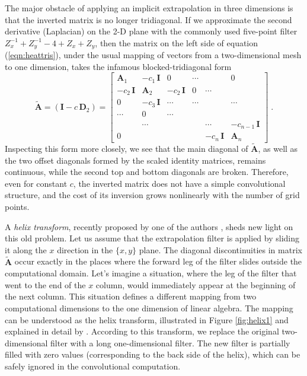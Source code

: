 The major obstacle of applying an implicit extrapolation in three
dimensions is that the inverted matrix is no longer tridiagonal. If we
approximate the second derivative (Laplacian) on the 2-D plane with
the commonly used five-point filter $Z_x^{-1} + Z_y^{-1} -4 + Z_x +
Z_y$, then the matrix on the left side of equation
(\ref{eqn:heattris}), under the usual mapping of vectors from a
two-dimensional mesh to one dimension, takes the infamous
blocked-tridiagonal form \cite[]{birk}
\begin{equation}\label{eqn:matrix2}
  \tilde{\mathbf{A}} = \left(\mathbf{I} -c\,\mathbf{D}_2\right) =
  \left[\begin{array}{cccccc}
  \mathbf{A}_1   & -c_1 \,\mathbf{I}    &  0     & \cdots &        & 0      \\
  -c_2 \,\mathbf{I}    & \mathbf{A}_2   & -c_2 \,\mathbf{I}    & 0      & \cdots &        \\
  0      & -c_3 \,\mathbf{I}     & \cdots & \cdots &        & \cdots \\
  \cdots & 0      & \cdots &        &        &        \\
         & \cdots &        &        & \cdots & -c_{n-1} \,\mathbf{I}    \\
  0      &        &        &        & -c_{n} \,\mathbf{I}    &
  \mathbf{A}_n
  \end{array}\right]\;.
\end{equation}
Inspecting this form more closely, we see that the main diagonal of
$\tilde{\mathbf{A}}$, as well as the two offset diagonals formed by the
scaled identity matrices, remains continuous, while the second top and
bottom diagonals are broken. Therefore, even for constant $c$, the
inverted matrix does not have a simple convolutional structure, and
the cost of its inversion grows nonlinearly with the number of grid
points.
\par
A \emph{helix transform}, recently proposed by one of the authors
\cite[]{Claerbout.sep.95.jon1}, sheds new light on this old problem.
Let us assume that the extrapolation filter is applied by sliding it
along the $x$ direction in the $\{x,y\}$ plane. The diagonal
discontinuities in matrix $\tilde{\mathbf{A}}$ occur exactly in the
places where the forward leg of the filter slides outside the
computational domain. Let's imagine a situation, where the leg of the
filter that went to the end of the $x$ column, would immediately
appear at the beginning of the next column. This situation defines a
different mapping from two computational dimensions to the one
dimension of linear algebra. The mapping can be understood as the
helix transform, illustrated in Figure \ref{fig:helix1} and explained
in detail by \cite{Claerbout.sep.95.jon1}. According to this
transform, we replace the original two-dimensional filter with a long
one-dimensional filter. The new filter is partially filled with zero
values (corresponding to the back side of the helix), which can be
safely ignored in the convolutional computation.


